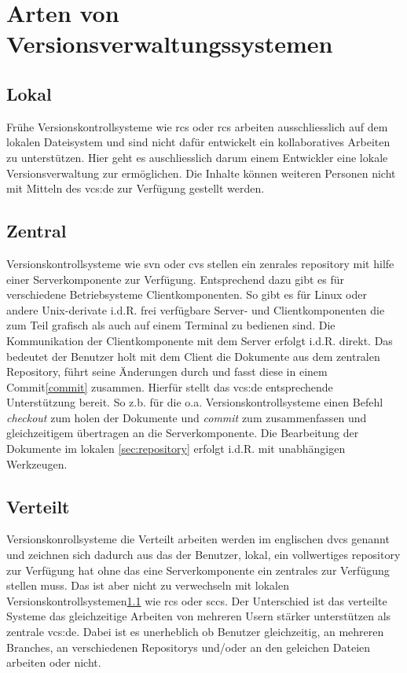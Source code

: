 \section{Arten von Versionsverwaltungssystemen}
\subsection{Lokal}\label{sec:local}
Frühe Versionskontrollsysteme wie \acrshort{rcs} oder \acrshort{rcs} arbeiten
ausschliesslich auf dem lokalen Dateisystem und sind nicht dafür entwickelt ein
kollaboratives Arbeiten zu unterstützen. Hier geht es auschliesslich darum
einem Entwickler eine lokale Versionsverwaltung zur ermöglichen. Die Inhalte
können weiteren Personen nicht mit Mitteln des \acrlong{vcs:de} zur Verfügung
gestellt werden.

\subsection{Zentral}\label{sec:central}
Versionskontrollsysteme wie \acrshort{svn} oder \acrshort{cvs} stellen ein
zenrales \gls{repository} mit hilfe einer Serverkomponente zur Verfügung.
Entsprechend dazu gibt es für verschiedene Betriebsysteme Clientkomponenten. So
gibt es für Linux oder andere Unix-derivate i.d.R. frei verfügbare Server- und
Clientkomponenten die zum Teil grafisch als auch auf einem Terminal zu bedienen
sind. Die Kommunikation der Clientkomponente mit dem Server erfolgt i.d.R.
direkt. Das bedeutet der Benutzer holt mit dem Client die Dokumente aus dem
zentralen Repository, führt seine Änderungen durch und fasst diese in einem
Commit\ref{commit} zusammen. Hierfür stellt das \acrlong{vcs:de} entsprechende
Unterstützung bereit. So z.b. für die o.a. Versionskontrollsysteme einen Befehl
\textit{checkout} zum holen der Dokumente und  \textit{commit} zum zusammenfassen
und gleichzeitigem übertragen an die Serverkomponente. Die Bearbeitung der
Dokumente im lokalen \ref{sec:repository} erfolgt i.d.R. mit unabhängigen
Werkzeugen.\cite[S.~38-40]{hagen:1678}

\subsection{Verteilt}\label{sec:decentral}
Versionskonrollsysteme die Verteilt arbeiten werden im englischen
\acrfull{dvcs} genannt und zeichnen sich dadurch aus das der Benutzer, lokal,
ein vollwertiges \gls{repository} zur Verfügung hat ohne das eine
Serverkomponente ein zentrales zur Verfügung stellen muss. Das ist aber nicht
zu verwechseln mit lokalen Versionskontrollsystemen\ref{sec:local} wie
\acrshort{rcs} oder \acrshort{sccs}. Der Unterschied ist das verteilte Systeme
das gleichzeitige Arbeiten von mehreren Usern stärker unterstützen als zentrale
\acrshort{vcs:de}. Dabei ist es unerheblich ob Benutzer gleichzeitig, an
mehreren Branches, an verschiedenen Repositorys und/oder an den geleichen
Dateien arbeiten oder nicht.\cite[S.~393-394]{cd}

